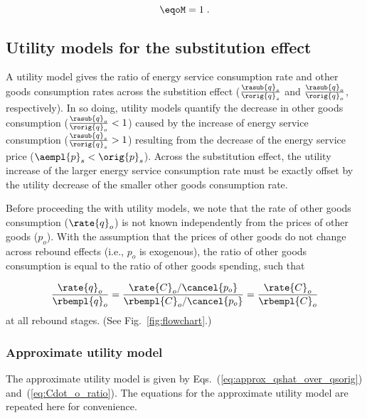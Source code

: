 \begin{equation} \label{eq:eqoM}
  \eqoM = 1 \; .
\end{equation}


\subsection{Utility models for the substitution effect}
\label{sec:utility_models_sub}

A utility model gives the ratio of energy service consumption rate 
and other goods consumption rates across the substition effect
($\frac{\rasub{q}_s}{\rorig{q}_s}$ and 
$\frac{\rasub{q}_o}{\rorig{q}_o}$, 
respectively).
In so doing, 
utility models quantify the decrease in other goods consumption
($\frac{\rasub{q}_o}{\rorig{q}_o} < 1$)
caused by the increase of energy service consumption
($\frac{\rasub{q}_s}{\rorig{q}_s} > 1$)
resulting from the decrease of the energy service price ($\aempl{p}_s < \orig{p}_s$).
Across the substitution effect, 
the utility increase of the larger energy service consumption rate
must be exactly offset
by the utility decrease of the smaller other goods consumption rate.

Before proceeding the with utility models,
we note that the rate of other goods consumption ($\rate{q}_o$)
is not known independently from the prices of other goods ($p_o$).
With the assumption that the prices of other goods do not change
across rebound effects
(i.e., $p_o$ is exogenous), 
the ratio of other goods consumption is equal to 
the ratio of other goods spending, such that

\begin{equation} \label{eq:exogenous_p_o}
  \frac{\rate{q}_o}{\rbempl{q}_o} 
      = \frac{\rate{C}_o/\cancel{p_o}}{\rbempl{C}_o/\cancel{p_o}} 
      = \frac{\rate{C}_o}{\rbempl{C}_o}
\end{equation}
%
at all rebound stages. 
(See Fig.~\ref{fig:flowchart}.)


\subsubsection{Approximate utility model} 
\label{sec:derivation_approx_utility_model}

The approximate utility model is given by Eqs.~(\ref{eq:approx_qshat_over_qsorig})
and~(\ref{eq:Cdot_o_ratio}).
The equations for the approximate utility model are repeated here
for convenience.

